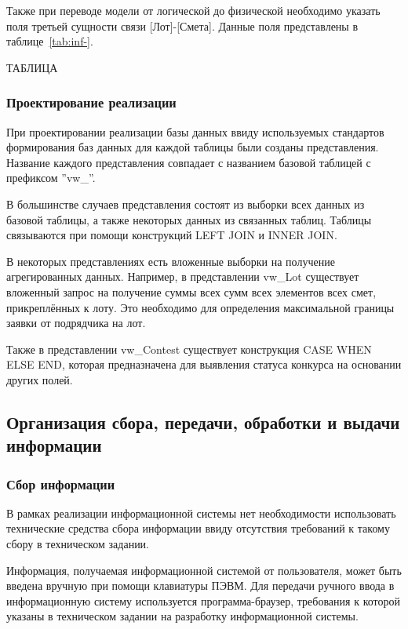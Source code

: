 Также при переводе модели от логической до физической необходимо указать поля третьей сущности связи [Лот]-[Смета]. Данные поля представлены в таблице~\ref{tab:inf-}.

ТАБЛИЦА

\subsubsection{Проектирование реализации}

При проектировании реализации базы данных ввиду используемых стандартов формирования баз данных для каждой таблицы были созданы представления.
Название каждого представления совпадает с названием базовой таблицей с префиксом ''vw\_''.

В большинстве случаев представления состоят из выборки всех данных из базовой таблицы, а также некоторых данных из связанных таблиц.
Таблицы связываются при помощи конструкций LEFT JOIN и INNER JOIN.

В некоторых представлениях есть вложенные выборки на получение агрегированных данных.
Например, в представлении vw\_Lot существует вложенный запрос на получение суммы всех сумм всех элементов всех смет, прикреплённых к лоту. Это необходимо для определения максимальной границы заявки от подрядчика на лот.

Также в представлении vw\_Contest существует конструкция CASE WHEN ELSE END, которая предназначена для выявления статуса конкурса на основании других полей.

\subsection{Организация сбора, передачи, обработки и выдачи информации}

\subsubsection{Сбор информации}

В рамках реализации информационной системы нет необходимости использовать технические средства сбора информации ввиду отсутствия требований к такому сбору в техническом задании.

Информация, получаемая информационной системой от пользователя, может быть введена вручную при помощи клавиатуры ПЭВМ.
Для передачи ручного ввода в информационную систему используется программа-браузер, требования к которой указаны в техническом задании на разработку информационной системы.


